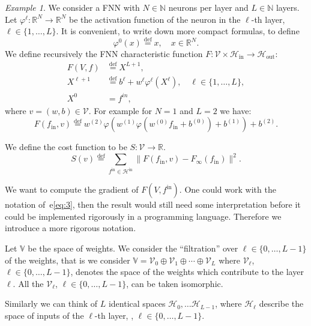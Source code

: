 \documentclass[10pt, a4paper]{article}
\theoremstyle{plain}
\theoremstyle{definition}
\theoremstyle{definition}
\theoremstyle{definition}
\theoremstyle{definition}
\theoremstyle{definition}
\theoremstyle{definition}
\theoremstyle{definition}
\theoremstyle{remark}
\theoremstyle{remark}
\newtheorem{example}[theorem]{Example}
\theoremstyle{rudin-style-generic}
\theoremstyle{rudin-style-generic*}
\theoremstyle{rudin-style-theorem}
\newcommand{\deq}{\stackrel{\mathrm{def}}{=}}
\newcommand{\NN}{\mathbb N}
\newcommand{\RR}{\mathbb R}
\newcommand*{\fin}{{f^{\text{in}}}}
\newcommand*{\SET}[1]{{\{ 0, \dots, #1 - 1 \}}}
\begin{document}
\begin{example}
  We consider a FNN with $N\in\NN$ neurons per layer and $L\in\NN$ layers.
  Let $\varphi^\ell:\RR^N\rightarrow\RR^N$ be the activation function of the neuron in the $\ell$-th layer, $\ell\in\{1,\dots, L\}$.
  It is convenient, to write down more compact formulas, to define
  $$
  \varphi^0(x) \deq x,\quad x\in \RR^N
  .
  $$
  We define recursively the FNN characteristic  function
  $F:\mathcal V\times \mathcal  H_{\text{in}}\rightarrow \mathcal H_{\text{out}}$:
  \begin{equation}
    \label{eq:3}
    \begin{aligned}
      F(V,f) &\deq X^{L+1} , \\
      X^{\ell+1} &\deq b^\ell + w^\ell \varphi^\ell ( X^\ell ),\quad \ell \in \{ 1,\dots , L\} , \\
      X^{0} &= f^{in},
    \end{aligned}
  \end{equation}
  where $v=(w,b)\in\mathcal V$.
  For example for $N=1$ and $L=2$ we have:
  $$
  F(f_{\text{in}},v) \deq  w^{(2)} \varphi( w^{(1)} \varphi( w^{(0)} f_{\text{in}} + b^{(0)} ) + b^{(1)} ) + b^{(2)} 
  .
  $$

  We define the cost function to be $S:\mathcal V \rightarrow\RR$.
  $$
  S(v) \deq \sum_{\fin\in\mathcal H^{\text{in}}} \|F(f_{\text{in}},v) - F_{\infty}(f_{\text{in}} ) \|^2
  .
  $$

  We want to compute the gradient of $F(V,\fin) $. One could work with the notation of~e\eqref{eq:3},
  then the result would still need some interpretation before it could be implemented rigorously in a programming language.
  Therefore we introduce a more rigorous notation.

  Let $\mathbb V$ be the space of weights. 
  We consider the ``filtration'' over $\ell\in\SET{L}$ of the weights,
  that is we consider $\mathbb V = \mathcal V_0\oplus\mathcal V_1\oplus \cdots\oplus\mathcal V_L$ where
  $\mathcal V_\ell$, $\ell\in\SET{L}$, denotes the space of the weights which contribute to the layer $\ell$.
  All the $\mathcal V_\ell$, $\ell\in\SET{L}$, can be taken isomorphic.

  Similarly we can think of $L$ identical spaces $\mathcal H_0,\dots\mathcal H_{L-1}$,
  where $\mathcal H_\ell$
  describe the space of inputs of the $\ell$-th layer, , $\ell\in\SET{L}$. 


\end{example}
\end{document}
